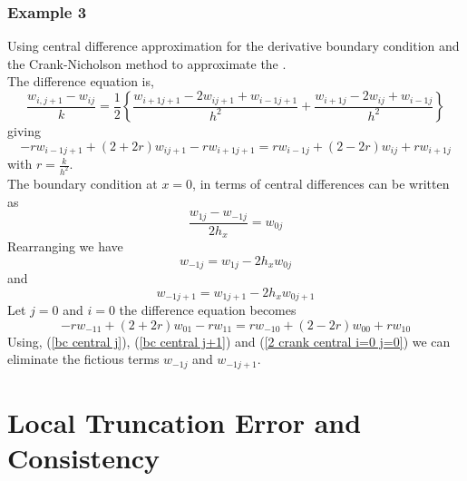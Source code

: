 \subsubsection{Example 3}
Using central difference approximation for the derivative boundary condition
and the Crank-Nicholson method to approximate the .\\
The difference equation is,
\[\frac{w_{i,j+1}-w_{ij}}{k}=\frac{1}{2}\left\{\frac{w_{i+1j+1}-2w_{ij+1}+w_{i-1j+1}}{h^2}+
\frac{w_{i+1j}-2w_{ij}+w_{i-1j}}{h^2}
\right\}
\]
giving
\begin{equation}
\label{2 crank central}
-rw_{i-1j+1}+(2+2r)w_{ij+1}-rw_{i+1j+1}
=
rw_{i-1j}+(2-2r)w_{ij}+rw_{i+1j}
\end{equation}
with $r=\frac{k}{h^2}$.\\
The boundary condition at $x=0$, in terms of central differences can be written as
\[
\frac{w_{1j}-w_{-1j}}{2h_x}=w_{0j} 
\]
Rearranging we have
\begin{equation}
\label{bc central j}
w_{-1j}=w_{1j}-2h_xw_{0j}
\end{equation}
and
\begin{equation}
\label{bc central j+1}
w_{-1j+1}=w_{1j+1}-2h_xw_{0j+1}
\end{equation}
Let $j=0$ and $i=0$ the difference equation becomes
\begin{equation}
\label{2 crank central i=0 j=0}
-rw_{-11}+(2+2r)w_{01}-rw_{11}
=
rw_{-10}+(2-2r)w_{00}+rw_{10}
\end{equation}
Using, (\ref{bc central j}), (\ref{bc central j+1}) and (\ref{2 crank central i=0 j=0}) we can eliminate the fictious terms $w_{-1j}$ and $w_{-1j+1}$.  


\section{Local Truncation Error and Consistency}

